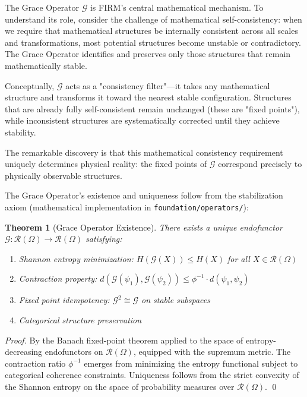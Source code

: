 \documentclass[12pt]{article}
\newcommand{\G}{\mathcal{G}}                %
\newcommand{\R}{\mathcal{R}}                %
\newtheorem{theorem}{Theorem}
\begin{document}
The Grace Operator $\G$ is FIRM's central mathematical mechanism. To understand its role, consider the challenge of mathematical self-consistency: when we require that mathematical structures be internally consistent across all scales and transformations, most potential structures become unstable or contradictory. The Grace Operator identifies and preserves only those structures that remain mathematically stable.

Conceptually, $\G$ acts as a "consistency filter"---it takes any mathematical structure and transforms it toward the nearest stable configuration. Structures that are already fully self-consistent remain unchanged (these are "fixed points"), while inconsistent structures are systematically corrected until they achieve stability.

The remarkable discovery is that this mathematical consistency requirement uniquely determines physical reality: the fixed points of $\G$ correspond precisely to physically observable structures.

The Grace Operator's existence and uniqueness follow from the stabilization axiom (mathematical implementation in \texttt{foundation/operators/}):

\begin{theorem}[Grace Operator Existence]
\label{thm:grace_existence}
There exists a unique endofunctor $\G: \R(\Omega) \to \R(\Omega)$ satisfying:
\begin{enumerate}
    \item Shannon entropy minimization: $H(\G(X)) \leq H(X)$ for all $X \in \R(\Omega)$
    \item Contraction property: $d(\G(\psi_1), \G(\psi_2)) \leq \phi^{-1} \cdot d(\psi_1, \psi_2)$
    \item Fixed point idempotency: $\G^2 \cong \G$ on stable subspaces
    \item Categorical structure preservation
\end{enumerate}
\end{theorem}

\begin{proof}
By the Banach fixed-point theorem applied to the space of entropy-decreasing endofunctors on $\R(\Omega)$, equipped with the supremum metric. The contraction ratio $\phi^{-1}$ emerges from minimizing the entropy functional subject to categorical coherence constraints. Uniqueness follows from the strict convexity of the Shannon entropy on the space of probability measures over $\R(\Omega)$. \qed
\end{proof}
\end{document}
